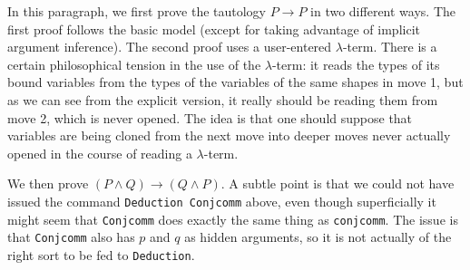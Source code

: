 \documentclass{article}
\begin{document}
In this paragraph, we first prove the tautology $P \rightarrow P$ in two different ways.  The first proof follows the basic model (except for taking advantage of implicit argument inference).  The second proof uses a user-entered $\lambda$-term.  There is a certain philosophical tension in the use of the $\lambda$-term:  it reads the types of its bound variables from the types of the variables of the same shapes in move 1, but as we can see from the explicit version, it really should be reading them from move 2, which is never opened.  The idea is that one should suppose that variables are being cloned from the next move into deeper moves never actually opened   in the course of reading a $\lambda$-term.

We then prove $(P \wedge Q) \rightarrow (Q \wedge P)$.  A subtle point is that we could not have issued the command {\tt Deduction Conjcomm} above,
even though superficially it might seem that {\tt Conjcomm} does exactly the same thing as {\tt conjcomm}.  The issue is that {\tt Conjcomm} also has $p$ and $q$ as hidden arguments, so it is not actually of the right sort to be fed to {\tt Deduction}.
\end{document}
